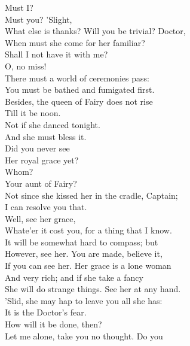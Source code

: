 \documentclass[a4paper,oneside,12pt]{memoir}
\begin{document}
\begin{drama*}
\dapperspeaks {} Must I?\\
\facespeaks {} Must you? 'Slight,\\
What else is thanks? Will you be trivial? Doctor,\\
When must she come for her familiar?\\
\dapperspeaks Shall I not have it with me?\\
\subtlespeaks {} O, no miss!\\
There must a world of ceremonies pass:\\
You must be bathed and fumigated first.\\
Besides, the queen of Fairy does not rise\\
Till it be noon.\\
\facespeaks {} Not if she danced tonight.\\
\subtlespeaks And she must bless it.\\
\facespeaks {} Did you never see\\
Her royal grace yet?\\
\dapperspeaks {} Whom?\\
\facespeaks {} Your aunt of Fairy?\\
\subtlespeaks Not since she kissed her in the cradle, Captain;\\
I can resolve you that.\\
\facespeaks {} Well, see her grace,\\
Whate'er it cost you, for a thing that I know.\\
It will be somewhat hard to compass; but\\
However, see her. You are made, believe it,\\
If you can see her. Her grace is a lone woman\\
And very rich; and if she take a fancy\\
She will do strange things. See her at any hand.\\
'Slid, she may hap to leave you all she has:\\
It is the Doctor's fear.\\
\dapperspeaks {} How will it be done, then?\\
\facespeaks Let me alone, take you no thought. Do you\\

\end{drama*}
\end{document}
